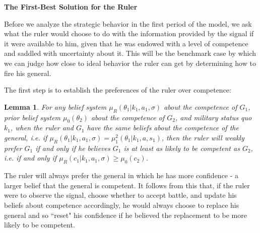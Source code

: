 \documentclass[11pt,]{article}
\newtheorem{lemma}[]{Lemma}
\begin{document}
\begin{center}
\textbf{\Large{The First-Best Solution for the Ruler}}\normalsize\\
\end{center}
Before we analyze the strategic behavior in the first period of the model, we ask what the ruler would choose to do with the information provided by the signal if it were available to him, given that he was endowed with a level of competence and saddled with uncertainty about it.  This will be the benchmark case by which we can judge how close to ideal behavior the ruler can get by determining how to fire his general.  



The first step is to establish the preferences of the ruler over competence:

\begin{lemma}  For any belief system $\mu_R(\theta_1|k_1,a_1,\sigma)$ about the competence of $G_1$, prior belief system $\mu_0(\theta_2)$ about the competence of $G_2$, and military status quo $k_1$, when the ruler and $G_1$ have the same beliefs about the competence of the general, i.e. if $\mu_R(\theta_1|k_1,a_1,\sigma)=\mu_1^2(\theta_1|k_1,a,s_1)$, then the ruler will weakly prefer $G_1$ if and only if he believes $G_1$ is at least as likely to be competent as $G_2$, i.e. if and only if $\mu_R(c_1|k_1,a_1,\sigma)\geq\mu_0(c_2)$.\label{preferences over competence}
\end{lemma}\noindent The ruler will always prefer the general in which he has more confidence - a larger belief that the general is competent.  It follows from this that, if the ruler were to observe the signal, choose whether to accept battle, and update his beliefs about competence accordingly, he would always choose to replace his general and so ``reset" his confidence if he believed the replacement to be more likely to be competent.
\end{document}
